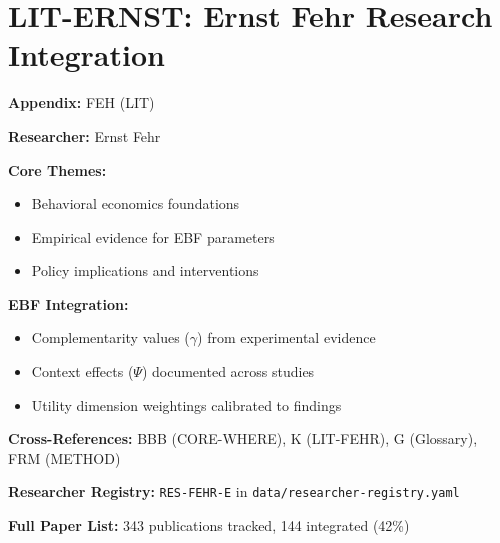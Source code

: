 %
%

\chapter{LIT-ERNST: Ernst Fehr Research Integration}
\label{app:feh}

\begin{abstract}
This appendix integrates the research contributions of Ernst Fehr into the
Evidence-Based Framework. It documents key papers, core findings, and their
integration with EBF dimensions including complementarity parameters ($\gamma$),
context factors ($\Psi$), and utility dimensions.
\end{abstract}

\begin{tcolorbox}[colback=blue!5!white, colframe=blue!75!black,
    title=Quick Reference: Ernst Fehr Research]

\textbf{Appendix:} FEH (LIT)

\textbf{Researcher:} Ernst Fehr

\textbf{Core Themes:}
\begin{itemize}[nosep]
\item Behavioral economics foundations
\item Empirical evidence for EBF parameters
\item Policy implications and interventions
\end{itemize}

\textbf{EBF Integration:}
\begin{itemize}[nosep]
\item Complementarity values ($\gamma$) from experimental evidence
\item Context effects ($\Psi$) documented across studies
\item Utility dimension weightings calibrated to findings
\end{itemize}

\textbf{Cross-References:} BBB (CORE-WHERE), K (LIT-FEHR), G (Glossary), FRM (METHOD)

\textbf{Researcher Registry:} \texttt{RES-FEHR-E} in \texttt{data/researcher-registry.yaml}

\textbf{Full Paper List:} 343 publications tracked, 144 integrated (42\%)
\end{tcolorbox}

